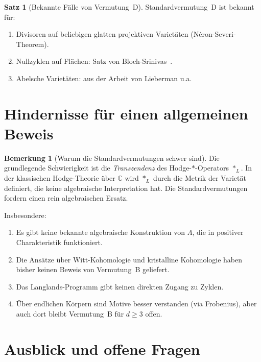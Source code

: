 \documentclass[12pt,a4paper]{amsart}
\theoremstyle{definition}
\newtheorem{satz}[theorem]{Satz}
\newtheorem{bemerkung}[theorem]{Bemerkung}
\newcommand{\C}{\mathbb{C}}
\begin{document}
\begin{satz}[Bekannte Fälle von Vermutung~D]
Standardvermutung~D ist bekannt für:
\begin{enumerate}[label=(\roman*)]
  \item Divisoren auf beliebigen glatten projektiven Varietäten (N\'eron-Severi-Theorem).
  \item Nullzyklen auf Flächen: Satz von Bloch-Srinivas~\cite{bloch1983}.
  \item Abelsche Varietäten: aus der Arbeit von Lieberman u.a.
\end{enumerate}
\end{satz}

\section{Hindernisse für einen allgemeinen Beweis}\label{sec:hindernisse}

\begin{bemerkung}[Warum die Standardvermutungen schwer sind]
Die grundlegende Schwierigkeit ist die \emph{Transzendenz} des Hodge-$*$-Operators
$*_L$.  In der klassischen Hodge-Theorie über $\C$ wird $*_L$ durch die
Metrik der Varietät definiert, die keine algebraische Interpretation hat.
Die Standardvermutungen fordern einen rein algebraischen Ersatz.

Insbesondere:
\begin{enumerate}[label=(\roman*)]
  \item Es gibt keine bekannte algebraische Konstruktion von $\Lambda$, die
        in positiver Charakteristik funktioniert.
  \item Die Ansätze über Witt-Kohomologie und kristalline Kohomologie haben
        bisher keinen Beweis von Vermutung~B geliefert.
  \item Das Langlands-Programm gibt keinen direkten Zugang zu Zyklen.
  \item Über endlichen Körpern sind Motive besser verstanden (via Frobenius),
        aber auch dort bleibt Vermutung~B für $d \geq 3$ offen.
\end{enumerate}
\end{bemerkung}

\section{Ausblick und offene Fragen}\label{sec:ausblick}
\end{document}

